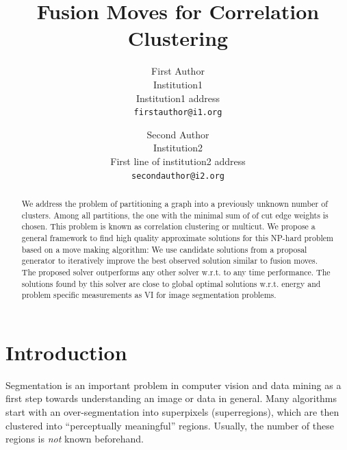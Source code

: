 \documentclass[10pt,twocolumn,letterpaper]{article}
\begin{document}

\title{Fusion Moves for Correlation Clustering}

\author{First Author\\
Institution1\\
Institution1 address\\
{\tt\small firstauthor@i1.org}
\and
Second Author\\
Institution2\\
First line of institution2 address\\
{\tt\small secondauthor@i2.org}
}

\maketitle


\begin{abstract}
   We address the problem of partitioning a  graph
   into a previously unknown number of clusters.
   Among all partitions, the one with the minimal 
   sum of of cut edge weights is chosen. 
   This problem is known as correlation clustering 
   or multicut.
   We propose a general framework to find
   high quality approximate solutions for 
   this NP-hard problem based on a move making algorithm:
   We use candidate solutions from a proposal generator
   to iteratively improve the best observed solution similar
   to fusion moves.
   The proposed solver outperforms any other solver
   w.r.t. to any time performance.
   The solutions found by this solver are close
   to global optimal solutions w.r.t. energy
   and problem specific measurements as VI for
   image segmentation problems.

\end{abstract}
\section{Introduction}

Segmentation is an important problem in computer vision and data mining as a first step
towards understanding an image or data in general. 
Many algorithms start with an over-segmentation
into superpixels (superregions), which are then clustered into ``perceptually meaningful''
regions.
Usually, the number of these regions is \emph{not} known beforehand.
\end{document}
